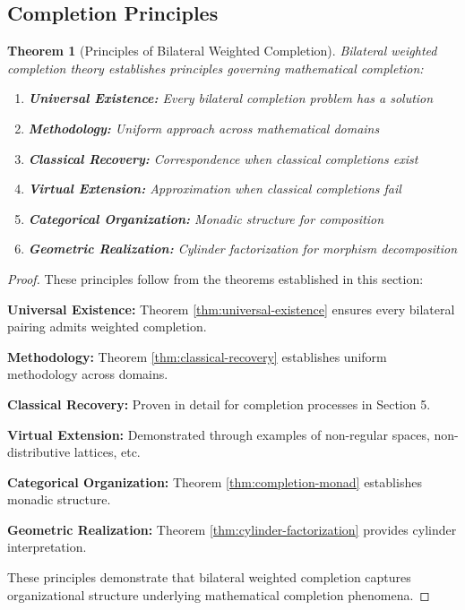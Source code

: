 \documentclass[11pt]{article}
\theoremstyle{plain}
\newtheorem{theorem}{Theorem}[section]
\theoremstyle{definition}
\theoremstyle{remark}
\begin{document}
\subsection{Completion Principles}

\begin{theorem}[Principles of Bilateral Weighted Completion]\label{thm:universal-principles}
Bilateral weighted completion theory establishes principles governing mathematical completion:

\begin{enumerate}
\item \textbf{Universal Existence:} Every bilateral completion problem has a solution
\item \textbf{Methodology:} Uniform approach across mathematical domains  
\item \textbf{Classical Recovery:} Correspondence when classical completions exist
\item \textbf{Virtual Extension:} Approximation when classical completions fail
\item \textbf{Categorical Organization:} Monadic structure for composition
\item \textbf{Geometric Realization:} Cylinder factorization for morphism decomposition
\end{enumerate}
\end{theorem}

\begin{proof}
These principles follow from the theorems established in this section:

\textbf{Universal Existence:} Theorem \ref{thm:universal-existence} ensures every bilateral pairing admits weighted completion.

\textbf{Methodology:} Theorem \ref{thm:classical-recovery} establishes uniform methodology across domains.

\textbf{Classical Recovery:} Proven in detail for completion processes in Section 5.

\textbf{Virtual Extension:} Demonstrated through examples of non-regular spaces, non-distributive lattices, etc.

\textbf{Categorical Organization:} Theorem \ref{thm:completion-monad} establishes monadic structure.

\textbf{Geometric Realization:} Theorem \ref{thm:cylinder-factorization} provides cylinder interpretation.

These principles demonstrate that bilateral weighted completion captures organizational structure underlying mathematical completion phenomena.
\end{proof}
\end{document}
